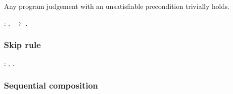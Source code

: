 \documentclass[12pt]{report}
\begin{document}
Any program judgement with an unsatisfiable precondition
    trivially holds. \begin{coqdoccode}
\coqdocemptyline
\coqdocnoindent
{}   :\coqdoceol
\coqdocindent{1.00em}
\coqdockw{\ensuremath{\forall}}    ,\coqdoceol
\coqdocindent{1.00em}
  \ensuremath{\rightarrow}      .\coqdoceol
\coqdocemptyline
\end{coqdoccode}
\subsubsection{Skip rule}

\begin{coqdoccode}
\coqdocemptyline
\coqdocnoindent
{}  :\coqdoceol
\coqdocindent{1.00em}
\coqdockw{\ensuremath{\forall}}   ,\coqdoceol
\coqdocindent{1.00em}
     .\coqdoceol
\coqdocemptyline
\end{coqdoccode}
\subsubsection{Sequential composition}
\end{document}
